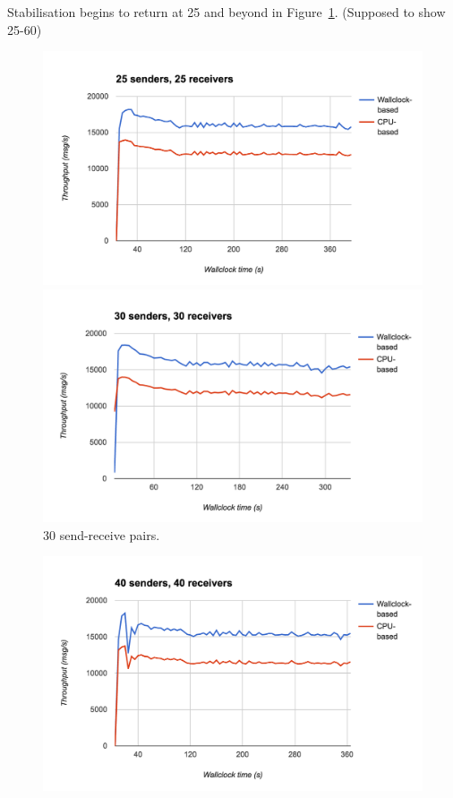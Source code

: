\documentclass[12pt,a4paper,twoside,openright]{report}
\begin{document}
{Stabilisation begins to return at 25 and beyond in Figure~\ref{fig:lots}. (Supposed to show 25-60)
\begin{figure}
  \centering\includegraphics[width=\textwidth]{../transcripts/lipsum/25n25/25n25.png}

  \centering\includegraphics[width=\textwidth]{../transcripts/lipsum/30n30/30n30.png}
  \caption{30 send-receive pairs.}
  \label{fig:lots}
\end{figure}
\begin{figure}
  \centering\includegraphics[width=\textwidth]{../transcripts/lipsum/40n40/40n40.png}


\end{figure}}
\end{document}
